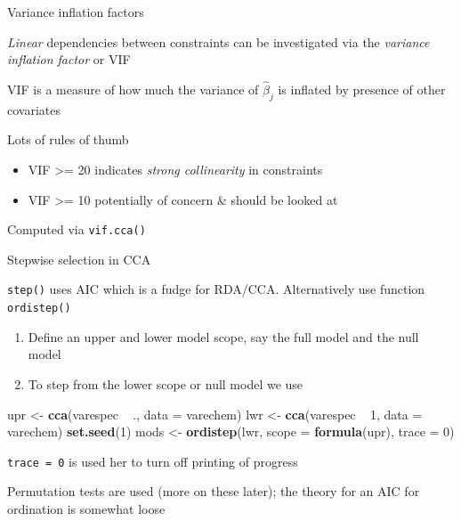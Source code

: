 \documentclass[10pt,ignorenonframetext,compress, aspectratio=169]{beamer}
\newenvironment{Shaded}{\begin{snugshade}}{\end{snugshade}}
\newcommand{\KeywordTok}[1]{\textcolor[rgb]{0.13,0.29,0.53}{\textbf{{#1}}}}
\newcommand{\DataTypeTok}[1]{\textcolor[rgb]{0.13,0.29,0.53}{{#1}}}
\newcommand{\DecValTok}[1]{\textcolor[rgb]{0.00,0.00,0.81}{{#1}}}
\newcommand{\StringTok}[1]{\textcolor[rgb]{0.31,0.60,0.02}{{#1}}}
\newcommand{\NormalTok}[1]{{#1}}
\begin{document}
\begin{frame}{Variance inflation factors}

\emph{Linear} dependencies between constraints can be investigated via
the \emph{variance inflation factor} or VIF

VIF is a measure of how much the variance of \(\hat{\beta}_j\) is
inflated by presence of other covariates

Lots of rules of thumb

\begin{itemize}
\itemsep1pt\parskip0pt
\item
  VIF \textgreater{}= 20 indicates \emph{strong collinearity} in
  constraints
\item
  VIF \textgreater{}= 10 potentially of concern \& should be looked at
\end{itemize}

Computed via \texttt{vif.cca()}

\end{frame}

\begin{frame}[fragile]{Stepwise selection in CCA}

\texttt{step()} uses AIC which is a fudge for RDA/CCA. Alternatively use
function \texttt{ordistep()}

\begin{enumerate}
\def\labelenumi{\arabic{enumi}.}
\itemsep1pt\parskip0pt
\item
  Define an upper and lower model scope, say the full model and the null
  model
\item
  To step from the lower scope or null model we use
\end{enumerate}

\scriptsize

\begin{Shaded}
\begin{Highlighting}[]
\NormalTok{upr <-}\StringTok{ }\KeywordTok{cca}\NormalTok{(varespec ~}\StringTok{ }\NormalTok{., }\DataTypeTok{data =} \NormalTok{varechem)}
\NormalTok{lwr <-}\StringTok{ }\KeywordTok{cca}\NormalTok{(varespec ~}\StringTok{ }\DecValTok{1}\NormalTok{, }\DataTypeTok{data =} \NormalTok{varechem)}
\KeywordTok{set.seed}\NormalTok{(}\DecValTok{1}\NormalTok{)}
\NormalTok{mods <-}\StringTok{ }\KeywordTok{ordistep}\NormalTok{(lwr, }\DataTypeTok{scope =} \KeywordTok{formula}\NormalTok{(upr), }\DataTypeTok{trace =} \DecValTok{0}\NormalTok{)}
\end{Highlighting}
\end{Shaded}

\normalsize

\texttt{trace\ =\ 0} is used her to turn off printing of progress

Permutation tests are used (more on these later); the theory for an AIC
for ordination is somewhat loose

\end{frame}
\end{document}
